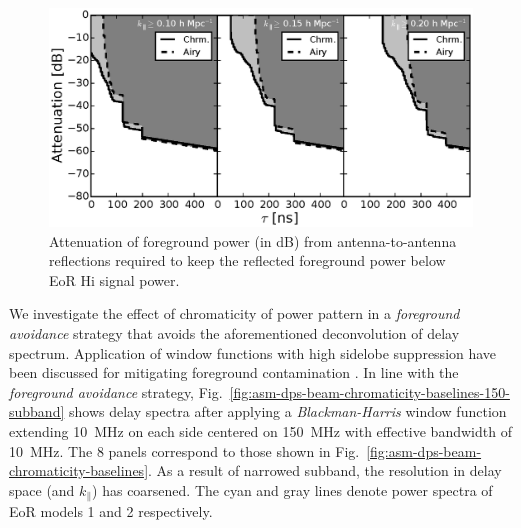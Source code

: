 \documentclass[preprint2,iop,numberedappendix,twocolappendix,appendixfloats]{emulateapj}
\begin{document}
\begin{figure}[htb]
\centering
\includegraphics[width=\linewidth]{spec_on_foreground_reflected_power_21cmfast_14.6m_150.0_MHz_subband_v2.eps}
\caption{Attenuation of foreground power (in dB) from antenna-to-antenna reflections required to keep the reflected foreground power below EoR H{\sc i} signal power.}
\label{fig:fg-reflections}
\end{figure}

We investigate the effect of chromaticity of power pattern in a {\it foreground avoidance} strategy that avoids the aforementioned deconvolution of delay spectrum. Application of window functions with high sidelobe suppression have been discussed for mitigating foreground contamination \citep{thy13}. In line with the {\it foreground avoidance} strategy, Fig.~\ref{fig:asm-dps-beam-chromaticity-baselines-150-subband} shows delay spectra after applying a {\it Blackman-Harris} window function extending 10~MHz on each side centered on 150~MHz with effective bandwidth of 10~MHz. The 8 panels correspond to those shown in Fig.~\ref{fig:asm-dps-beam-chromaticity-baselines}. As a result of narrowed subband, the resolution in delay space (and $k_\parallel$) has coarsened. The cyan and gray lines denote power spectra of EoR models 1 and 2 respectively. 
\end{document}
